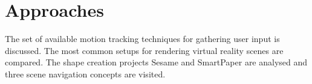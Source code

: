 \section{Approaches}

The set of available motion tracking techniques for gathering user input is discussed.
The most common setups for rendering virtual reality scenes are compared.
The shape creation projects Sesame and SmartPaper are analysed and three scene navigation concepts are visited.








